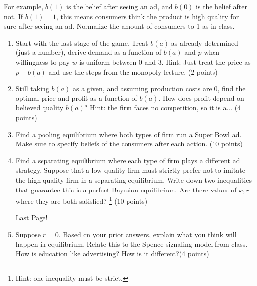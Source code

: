 \documentclass{article}
\begin{document}
\begin{enumerate}
       For example, $b(1)$ is the belief after seeing an ad, and $b(0)$ is the belief after not. If $b(1)=1$, this means consumers think the product is high quality for sure after seeing an ad. Normalize the amount of consumers to 1 as in class.
      
      \begin{enumerate}
          \item Start with the last stage of the game. Treat $b(a)$ as already determined (just a number), derive demand as a function of $b(a)$ and $p$ when willingness to pay $w$ is uniform between 0 and 3. Hint: Just treat the price as $p-b(a)$ and use the steps from the monopoly lecture. (2 points)
          
        \vspace{6cm}

          \item Still taking $b(a)$ as a given, and assuming production costs are 0, find the optimal price and profit as a function of $b(a)$. How does profit depend on believed quality $b(a)$? Hint: the firm faces no competition, so it is a... (4 points)
          
         \pagebreak
         
          
          \item Find a pooling equilibrium where both types of firm run a Super Bowl ad. Make sure to specify beliefs of the consumers after each action. (10 points)
          
         \vspace{10cm}
        
          
          \item Find a separating equilibrium where each type of firm plays a different ad strategy. Suppose that a low quality firm must strictly prefer not to imitate the high quality firm in a separating equilibrium. Write down two inequalities that guarantee this is a perfect Bayesian equilibrium. Are there values of $x,r$ where they are both satisfied? \footnote{Hint: one inequality must be strict.} (10 points)
          
          \vspace{8cm}
          
        \pagebreak
        
        Last Page!
        \vspace{5cm}
        
          \item Suppose $r=0$. Based on your prior answers, explain what you think will happen in equilibrium. Relate this to the Spence signaling model from class. How is education like advertising? How is it different?(4 points)
\vspace{5cm}
          
          
      \end{enumerate}
      
      
      
\end{enumerate}
\end{document}
